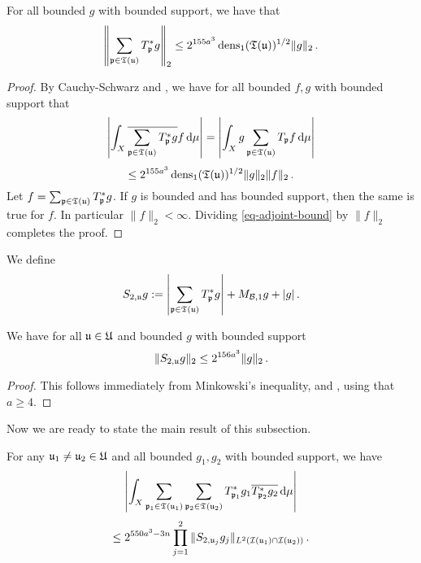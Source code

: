 \begin{lemma}
    \label{adjoint-tree-estimate}
    \leanok
    For all bounded $g$ with bounded support, we have that
    $$
        \left\| \sum_{{\mathfrak p} \in {\mathfrak T}({\mathfrak u})} T_{{\mathfrak p}}^* g\right\|_2 \le 2^{155a^3} \operatorname{\operatorname{dens}}_1({\mathfrak T}({\mathfrak u}))^{1/2} \|g\|_2\,.
    $$
\end{lemma}

\begin{proof}
    By Cauchy-Schwarz and , we have for all bounded $f,g$ with bounded support that
    $$
        \left| \int_X \overline{\sum_{{\mathfrak p}\in {\mathfrak T}({\mathfrak u})} T_{{\mathfrak p}}^* g} f \,\mathrm{d}\mu \right| = \left| \int_X g \sum_{{\mathfrak p} \in {\mathfrak T}({\mathfrak u})} T_{{\mathfrak p}} f \,\mathrm{d}\mu \right|
    $$
    \begin{equation}
        \label{eq-adjoint-bound}
        \le 2^{155a^3} \operatorname{\operatorname{dens}}_1({\mathfrak T}({\mathfrak u}))^{1/2} \|g\|_2 \|f\|_2\,.
    \end{equation}
    Let $f = \sum_{{\mathfrak p} \in {\mathfrak T}({\mathfrak u})} T_{{\mathfrak p}}^* g$. If $g$ is bounded and has bounded support, then the same is true for $f$. In particular $\|f\|_2 < \infty$. Dividing \eqref{eq-adjoint-bound} by $\|f\|_2$ completes the proof.
\end{proof}

We define
$$
    S_{2,{\mathfrak u}}g := \left|\sum_{{\mathfrak p} \in {\mathfrak T}({\mathfrak u})} T_{{\mathfrak p}}^*g \right| + M_{\mathcal{B},1}g + |g|\,.
$$
\begin{lemma}
    \label{adjoint-tree-control}
    \leanok
    We have for all ${\mathfrak u} \in {\mathfrak U}$ and bounded $g$ with bounded support
    $$
        \|S_{2, {\mathfrak u}} g\|_2 \le 2^{156a^3} \|g\|_2\,.
    $$
\end{lemma}

\begin{proof}
    \leanok
    This follows immediately from Minkowski's inequality,  and , using that $a \ge 4$.
\end{proof}


Now we are ready to state the main result of this subsection.

\begin{lemma}
    \label{correlation-separated-trees}
    \leanok
    For any ${\mathfrak u}_1 \ne {\mathfrak u}_2 \in {\mathfrak U}$ and all bounded $g_1, g_2$ with bounded support, we have
    \begin{equation}
        \label{eq-lhs-sep-tree}
        \left| \int_X \sum_{{\mathfrak p}_1 \in {\mathfrak T}({\mathfrak u}_1)} \sum_{{\mathfrak p}_2 \in {\mathfrak T}({\mathfrak u}_2)} T^*_{{\mathfrak p}_1}g_1 \overline{T^*_{{\mathfrak p}_2}g_2 }\,\mathrm{d}\mu \right|
    \end{equation}
    \begin{equation}
        \label{eq-rhs-sep-tree}
        \le 2^{550a^3-3n} \prod_{j =1}^2 \| S_{2, {\mathfrak u}_j} g_j\|_{L^2({\mathcal{I}}({\mathfrak u}_1) \cap {\mathcal{I}}({\mathfrak u}_2))}\,.
    \end{equation}
\end{lemma}

